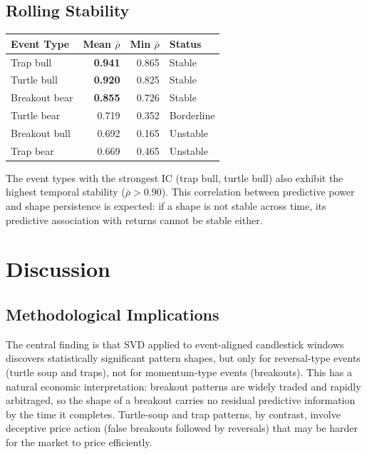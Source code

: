 \documentclass[11pt,a4paper]{article}
\theoremstyle{definition}
\theoremstyle{plain}
\begin{document}
\subsection{Rolling Stability}

\begin{center}
\begin{tabular}{lrrl}
\hline
\textbf{Event Type} & \textbf{Mean $\bar{\rho}$} & \textbf{Min $\bar{\rho}$} & \textbf{Status} \\
\hline
Trap bull      & \textbf{0.941} & 0.865 & Stable     \\
Turtle bull    & \textbf{0.920} & 0.825 & Stable     \\
Breakout bear  & \textbf{0.855} & 0.726 & Stable     \\
Turtle bear    & 0.719          & 0.352 & Borderline \\
Breakout bull  & 0.692          & 0.165 & Unstable   \\
Trap bear      & 0.669          & 0.465 & Unstable   \\
\hline
\end{tabular}
\end{center}

The event types with the strongest IC (trap bull, turtle bull) also exhibit
the highest temporal stability ($\bar{\rho} > 0.90$). This correlation
between predictive power and shape persistence is expected: if a shape is
not stable across time, its predictive association with returns cannot be
stable either.

\section{Discussion}
\label{sec:discussion}

\subsection{Methodological Implications}

The central finding is that SVD applied to event-aligned candlestick
windows discovers statistically significant pattern shapes, but only for
reversal-type events (turtle soup and traps), not for momentum-type events
(breakouts). This has a natural economic interpretation: breakout patterns
are widely traded and rapidly arbitraged, so the shape of a breakout
carries no residual predictive information by the time it completes.
Turtle-soup and trap patterns, by contrast, involve deceptive price action
(false breakouts followed by reversals) that may be harder for the market
to price efficiently.
\end{document}
